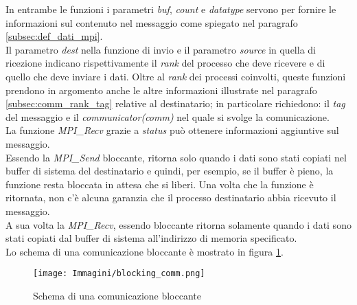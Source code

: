 In entrambe le funzioni i parametri \textit{buf}, \textit{count} e \textit{datatype} servono per fornire le informazioni sul contenuto nel messaggio come spiegato nel paragrafo \ref{subsec:def_dati_mpi}.\\
Il parametro \textit{dest} nella funzione di invio e il parametro \textit{source} in quella di ricezione indicano rispettivamente il \textit{rank} del processo che deve ricevere e di quello che deve inviare i dati. Oltre al \textit{rank} dei processi coinvolti, queste funzioni prendono in argomento anche le altre informazioni illustrate nel paragrafo \ref{subsec:comm_rank_tag} relative al destinatario; in particolare richiedono: il \textit{tag} del messaggio e il \textit{communicator(comm)} nel quale si svolge la comunicazione.\\
La funzione \textit{MPI\_Recv} grazie a \textit{status} può ottenere informazioni aggiuntive sul messaggio.\\
Essendo la \textit{MPI\_Send} bloccante, ritorna solo quando i dati sono stati copiati nel buffer di sistema del destinatario e quindi, per esempio, se il buffer è pieno, la funzione resta bloccata in attesa che si liberi. Una volta che la funzione è ritornata, non c’è alcuna garanzia che il processo destinatario abbia ricevuto il messaggio.\\
A sua volta la \textit{MPI\_Recv}, essendo bloccante ritorna solamente quando i dati sono stati copiati dal buffer di sistema all’indirizzo di memoria specificato.\\
Lo schema di una comunicazione bloccante è mostrato in figura \ref{fig:mpi_block_com}.
\begin{figure}[H]
	\centering
	\texttt{[image: Immagini/blocking\_comm.png]}
	\caption{Schema di una comunicazione bloccante}
	\label{fig:mpi_block_com}
\end{figure}
